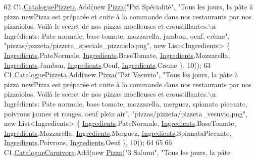 \begin{DoxyCode}
62             C1.\hyperlink{classModele_1_1Catalogue_ac5490e1026b5b08d43e30b68da893423}{CataloguePizzeta}.Add(\textcolor{keyword}{new} \hyperlink{classModele_1_1Pizza}{Pizza}(\textcolor{stringliteral}{"Pzt Spécialité"}, \textcolor{stringliteral}{"Tous les jours, la
       pâte à pizza newPizza est préparée et cuite à la commande dans nos restaurants par nos pizzaiolos. Voilà le
       secret de nos pizzas moelleuses et croustillantes.\(\backslash\)n Ingrédients: Pate normale, base tomate, mozzarella,
       jambon, oeuf, crème"}, \textcolor{stringliteral}{"pizzas/pizzeta/pizzeta\_speciale\_pizzaiolo.png"}, \textcolor{keyword}{new} List<Ingredients> \{ 
      \hyperlink{namespaceModele_a001a8e89e56a724f24a249ba98080d41}{Ingredients}.PateNormale, \hyperlink{namespaceModele_a001a8e89e56a724f24a249ba98080d41}{Ingredients}.BaseTomate, 
      \hyperlink{namespaceModele_a001a8e89e56a724f24a249ba98080d41}{Ingredients}.Mozzarella, \hyperlink{namespaceModele_a001a8e89e56a724f24a249ba98080d41}{Ingredients}.Jambon, \hyperlink{namespaceModele_a001a8e89e56a724f24a249ba98080d41}{Ingredients}.Oeuf, 
      \hyperlink{namespaceModele_a001a8e89e56a724f24a249ba98080d41}{Ingredients}.Creme \}, 10));
63             C1.\hyperlink{classModele_1_1Catalogue_ac5490e1026b5b08d43e30b68da893423}{CataloguePizzeta}.Add(\textcolor{keyword}{new} \hyperlink{classModele_1_1Pizza}{Pizza}(\textcolor{stringliteral}{"Pzt Vesuvio"}, \textcolor{stringliteral}{"Tous les jours, la pâte
       à pizza newPizza est préparée et cuite à la commande dans nos restaurants par nos pizzaiolos. Voilà le
       secret de nos pizzas moelleuses et croustillantes.\(\backslash\)n Ingrédients: Pate normale, base tomate, mozzarella, merguez,
       spianata piccante, poivrons jaunes et rouges, oeuf plein air"}, \textcolor{stringliteral}{"pizzas/pizzeta/pizzeta\_vesuvio.png"}, \textcolor{keyword}{new} 
      List<Ingredients> \{ \hyperlink{namespaceModele_a001a8e89e56a724f24a249ba98080d41}{Ingredients}.PateNormale, \hyperlink{namespaceModele_a001a8e89e56a724f24a249ba98080d41}{Ingredients}.BaseTomate, 
      \hyperlink{namespaceModele_a001a8e89e56a724f24a249ba98080d41}{Ingredients}.Mozzarella, \hyperlink{namespaceModele_a001a8e89e56a724f24a249ba98080d41}{Ingredients}.Merguez, \hyperlink{namespaceModele_a001a8e89e56a724f24a249ba98080d41}{Ingredients}.SpianataPiccante,
       \hyperlink{namespaceModele_a001a8e89e56a724f24a249ba98080d41}{Ingredients}.Poivrons, \hyperlink{namespaceModele_a001a8e89e56a724f24a249ba98080d41}{Ingredients}.Oeuf \}, 10));
64 
65 
66             C1.\hyperlink{classModele_1_1Catalogue_a4af9ef768f67cef6dfe545e22a6d63af}{CatalogueCarnivore}.Add(\textcolor{keyword}{new} \hyperlink{classModele_1_1Pizza}{Pizza}(\textcolor{stringliteral}{"3 Salumi"}, \textcolor{stringliteral}{"Tous les jours, la pâte
}
\end{DoxyCode}

